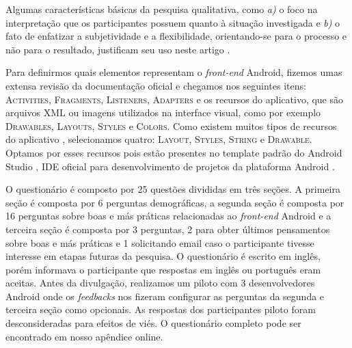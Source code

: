 
Algumas características básicas da pesquisa qualitativa, como \textit{a)} o foco na interpretação que os participantes possuem quanto à situação investigada e \textit{b)} o fato de enfatizar a subjetividade e a flexibilidade, orientando-se para o processo e não para o resultado, justificam seu uso neste artigo \cite{Prates2015, King1994}.

Para definirmos quais elementos representam o \textit{front-end} Android, fizemos umas extensa revisão da documentação oficial e chegamos nos seguintes itens: \textsc{Activities}, \textsc{Fragments}, \textsc{Listeners}, \textsc{Adapters} e os recursos do aplicativo, que são arquivos XML ou imagens utilizados na interface visual, como por exemplo \textsc{Drawables}, \textsc{Layouts}, \textsc{Styles} e \textsc{Colors}. Como existem muitos tipos de recursos do aplicativo \cite{AndroidResourcesOverview}, selecionamos quatro: \textsc{Layout}, \textsc{Styles}, \textsc{String} e \textsc{Drawable}. Optamos por esses recursos pois estão presentes no template padrão do Android Studio \cite{FirstApp2017}, IDE oficial para desenvolvimento de projetos da plataforma Android \cite{AndroidStudio}.

O questionário é composto por 25 questões divididas em três seções. A primeira seção é composta por 6 perguntas demográficas, a segunda seção é composta por 16 perguntas sobre boas e más práticas relacionadas ao \textit{front-end} Android e a terceira seção é composta por 3 perguntas, 2 para obter últimos pensamentos sobre boas e más práticas e 1 solicitando email caso o participante tivesse interesse em etapas futuras da pesquisa. O questionário é escrito em inglês, porém informava o participante que respostas em inglês ou português eram aceitas. Antes da divulgação, realizamos um piloto com 3 desenvolvedores Android onde os \textit{feedbacks} nos fizeram configurar as perguntas da segunda e terceira seção como opcionais. As respostas dos participantes piloto foram desconsideradas para efeitos de viés. O questionário completo pode ser encontrado em nosso apêndice online.

